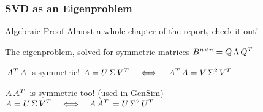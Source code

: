 \begin{frame}[plain]
	\frametitle{SVD as an Eigenproblem}
	\begin{block}{Algebraic Proof}
    Almost a whole chapter of the report, check it out!
	\end{block}   
	\begin{block}{The eigenproblem, solved for symmetric matrices}
    $B^{n \times n} = Q\,\Lambda\,{Q}^{T}\,$
	\end{block}
	\begin{block}{$\,{A}^{T}\,A$ is symmetric!}
    $A = U\, \Sigma \,{V}^{T}\, \,\,\,\,\iff\,\,\,\, \,{A}^{T}\,A = V\, \Sigma^2 \,{V}^{T}\,$
	\end{block}   
	\begin{block}{$A\,{A}^{T}\,$ is symmetric too! (used in GenSim)}
    $A = U\, \Sigma \,{V}^{T}\, \,\,\,\,\iff\,\,\,\, A\,{A}^{T}\, = U\, \Sigma^2 \,{U}^{T}\,$
	\end{block}
\end{frame}
